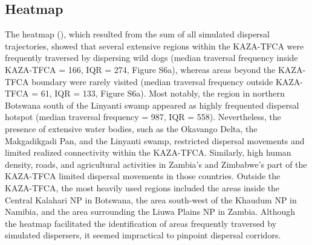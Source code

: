 \documentclass[abstract=on,10pt,a4paper,bibliography=totocnumbered]{article}
\begin{document}
\subsection{Heatmap}
The heatmap (), which resulted from the sum of all simulated
dispersal trajectories, showed that several extensive regions within the
KAZA-TFCA were frequently traversed by dispersing wild dogs (median traversal
frequency inside KAZA-TFCA = 166, IQR = 274, Figure S6a), whereas areas beyond
the KAZA-TFCA boundary were rarely visited (median traversal frequency outside
KAZA-TFCA = 61, IQR = 133, Figure S6a). Most notably, the region in northern
Botswana south of the Linyanti swamp appeared as highly frequented dispersal
hotspot (median traversal frequency = 987, IQR = 558). Nevertheless, the
presence of extensive water bodies, such as the Okavango Delta, the Makgadikgadi
Pan, and the Linyanti swamp, restricted dispersal movements and limited realized
connectivity within the KAZA-TFCA. Similarly, high human density, roads, and
agricultural activities in Zambia's and Zimbabwe's part of the KAZA-TFCA limited
dispersal movements in those countries. Outside the KAZA-TFCA, the most heavily
used regions included the areas inside the Central Kalahari NP in Botswana, the
area south-west of the Khaudum NP in Namibia, and the area surrounding the Liuwa
Plains NP in Zambia. Although the heatmap facilitated the identification of
areas frequently traversed by simulated dispersers, it seemed impractical to
pinpoint dispersal corridors.
\end{document}

